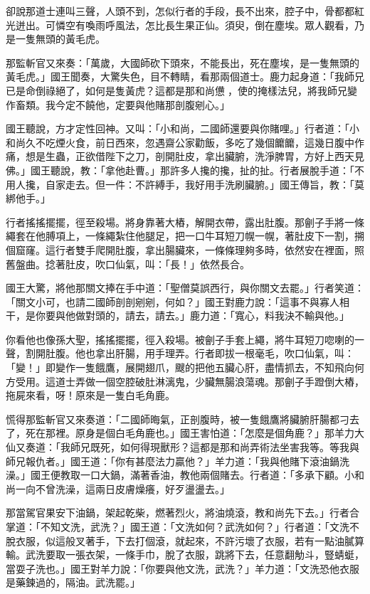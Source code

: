 卻說那道士連叫三聲，人頭不到，怎似行者的手段，長不出來，腔子中，骨都都紅光迸出。可憐空有喚雨呼風法，怎比長生果正仙。須臾，倒在塵埃。眾人觀看，乃是一隻無頭的黃毛虎。

那監斬官又來奏：「萬歲，大國師砍下頭來，不能長出，死在塵埃，是一隻無頭的黃毛虎。」國王聞奏，大驚失色，目不轉睛，看那兩個道士。鹿力起身道：「我師兄已是命倒祿絕了，如何是隻黃虎？這都是那和尚憊𪬯，使的掩樣法兒，將我師兄變作畜類。我今定不饒他，定要與他賭那剖腹剜心。」

國王聽說，方才定性回神。又叫：「小和尚，二國師還要與你賭哩。」行者道：「小和尚久不吃煙火食，前日西來，忽遇齋公家勸飯，多吃了幾個饝饝，這幾日腹中作痛，想是生蟲，正欲借陛下之刀，剖開肚皮，拿出臟腑，洗淨脾胃，方好上西天見佛。」國王聽說，教：「拿他赴曹。」那許多人攙的攙，扯的扯。行者展脫手道：「不用人攙，自家走去。但一件：不許縛手，我好用手洗刷臟腑。」國王傳旨，教：「莫綁他手。」

行者搖搖擺擺，徑至殺場。將身靠著大樁，解開衣帶，露出肚腹。那劊子手將一條繩套在他膊項上，一條繩紮住他腿足，把一口牛耳短刀幌一幌，著肚皮下一割，搠個窟窿。這行者雙手爬開肚腹，拿出腸臟來，一條條理夠多時，依然安在裡面，照舊盤曲。捻著肚皮，吹口仙氣，叫：「長！」依然長合。

國王大驚，將他那關文捧在手中道：「聖僧莫誤西行，與你關文去罷。」行者笑道：「關文小可，也請二國師剖剖剜剜，何如？」國王對鹿力說：「這事不與寡人相干，是你要與他做對頭的，請去，請去。」鹿力道：「寬心，料我決不輸與他。」

你看他也像孫大聖，搖搖擺擺，徑入殺場。被劊子手套上繩，將牛耳短刀唿喇的一聲，割開肚腹。他也拿出肝腸，用手理弄。行者即拔一根毫毛，吹口仙氣，叫：「變！」即變作一隻餓鷹，展開翅爪，颼的把他五臟心肝，盡情抓去，不知飛向何方受用。這道士弄做一個空腔破肚淋漓鬼，少臟無腸浪蕩魂。那劊子手蹬倒大樁，拖屍來看，呀！原來是一隻白毛角鹿。

慌得那監斬官又來奏道：「二國師晦氣，正剖腹時，被一隻餓鷹將臟腑肝腸都刁去了，死在那裡。原身是個白毛角鹿也。」國王害怕道：「怎麼是個角鹿？」那羊力大仙又奏道：「我師兄既死，如何得現獸形？這都是那和尚弄術法坐害我等。等我與師兄報仇者。」國王道：「你有甚麼法力贏他？」羊力道：「我與他賭下滾油鍋洗澡。」國王便教取一口大鍋，滿著香油，教他兩個賭去。行者道：「多承下顧。小和尚一向不曾洗澡，這兩日皮膚燥癢，好歹盪盪去。」

那當駕官果安下油鍋，架起乾柴，燃著烈火，將油燒滾，教和尚先下去。」行者合掌道：「不知文洗，武洗？」國王道：「文洗如何？武洗如何？」行者道：「文洗不脫衣服，似這般叉著手，下去打個滾，就起來，不許污壞了衣服，若有一點油膩算輸。武洗要取一張衣架，一條手巾，脫了衣服，跳將下去，任意翻觔斗，豎蜻蜓，當耍子洗也。」國王對羊力說：「你要與他文洗，武洗？」羊力道：「文洗恐他衣服是藥鍊過的，隔油。武洗罷。」

